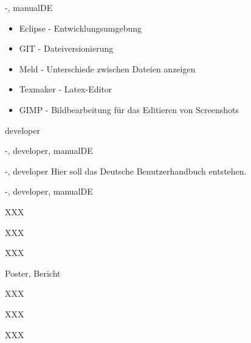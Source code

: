 \documentclass[twoside]{report}
\begin{document}
\begin{shownto}{-, manualDE}
\nsecend

\begin{itemize}
\item{Eclipse - Entwicklungsumgebung}
\item{GIT - Dateiversionierung}
\item{Meld - Unterschiede zwischen Dateien anzeigen}
\item{Texmaker - Latex-Editor}
\item{GIMP - Bildbearbeitung für das Editieren von Screenshots}
\end{itemize}
\nsecend



\nsecend %

\end{shownto} %
\begin{shownto}{developer}


\end{shownto}

\begin{shownto}{-, developer, manualDE}



\nsecend


\nsecend


\nsecend


\nsecend




\end{shownto} %
\begin{shownto}{-, developer}
Hier soll das Deutsche Benutzerhandbuch entstehen.
\end{shownto} %
\begin{shownto}{-, developer, manualDE}
\nsecend

XXX
\nsecend

XXX
\nsecend

\nsecend %



XXX
\nsecend

Poster, Bericht
\nsecend

XXX
\nsecend

XXX
\nsecend

XXX
\nsecend


\nsecend %

\end{shownto} %
\end{document}
